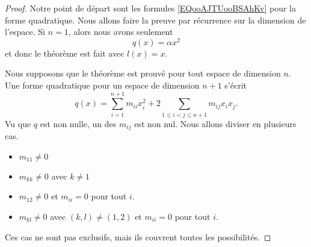\begin{proof}
	Notre point de départ sont les formules \eqref{EQooAJTUooBSAhKv} pour la forme quadratique. Nous allons faire la preuve par récurrence sur la dimension de l'espace. Si \( n=1\), alors nous avons seulement
	\begin{equation}
		q(x)=\alpha x^2
	\end{equation}
	et donc le théorème est fait avec \( l(x)=x\).

	Nous supposons que le théorème est prouvé pour tout espace de dimension \( n\). Une forme quadratique pour un espace de dimension \( n+1\) s'écrit
	\begin{equation}
		q(x)=\sum_{i=1}^{n+1}m_{ii}x_i^2+2\sum_{1\leq i < j\leq n+1}m_{ij}x_ix_j.
	\end{equation}
	Vu que \( q\) est non nulle, un des \( m_{ij}\) est non nul. Nous allons diviser en plusieurs cas.
	\begin{itemize}
		\item
		      \( m_{11}\neq 0\)
		\item
		      \( m_{kk}\neq 0\) avec \( k\neq 1\)
		\item
		      \( m_{12}\neq 0\) et \( m_{ii}=0\) pour tout \( i\).
		\item
		      \( m_{kl}\neq 0\) avec \( (k,l)\neq (1,2)\) et \( m_{ii}=0\) pour tout \( i\).
	\end{itemize}
	Ces cas ne sont pas exclusifs, mais ils couvrent toutes les possibilités.


\end{proof}
